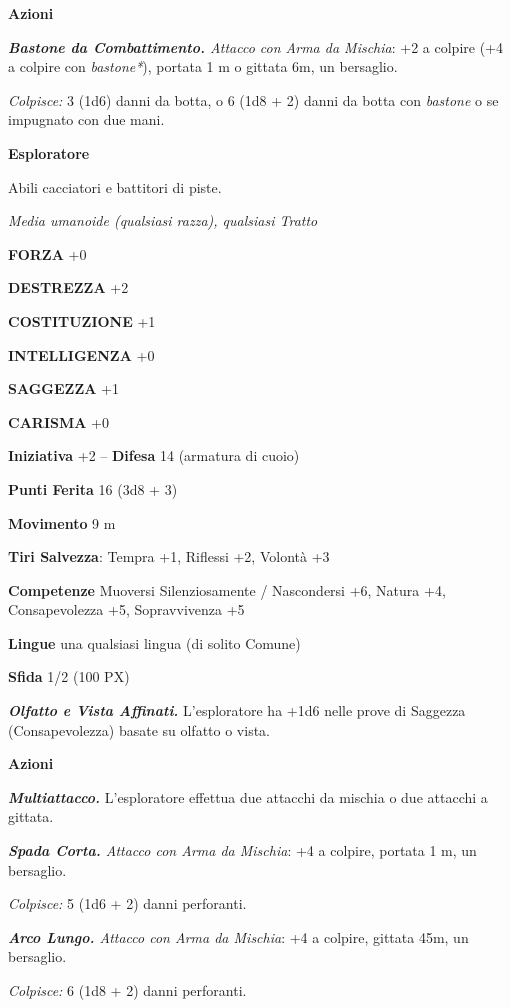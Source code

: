 \begin{multicols}{2}
	\textbf{Azioni}

	\textit{\textbf{Bastone da Combattimento.} Attacco con Arma da Mischia}: +2 a colpire (+4 a colpire con \textit{bastone*}), portata 1 m o gittata 6m, un bersaglio.

	\textit{Colpisce:} 3 (1d6) danni da botta, o 6 (1d8 + 2) danni da botta con \textit{bastone} o se impugnato con due mani.

	\medskip\textbf{Esploratore}

	Abili cacciatori e battitori di piste.

	\textit{Media umanoide (qualsiasi razza), qualsiasi Tratto}

	\textbf{FORZA} +0

	\textbf{DESTREZZA} +2

	\textbf{COSTITUZIONE} +1

	\textbf{INTELLIGENZA} +0

	\textbf{SAGGEZZA} +1

	\textbf{CARISMA} +0

	\textbf{Iniziativa} +2 -- \textbf{Difesa} 14 (armatura di cuoio)

	\textbf{Punti Ferita} 16 (3d8 + 3)

	\textbf{Movimento} 9 m

	\textbf{Tiri Salvezza}: Tempra +1, Riflessi +2, Volontà +3

	\textbf{Competenze} Muoversi Silenziosamente / Nascondersi +6, Natura +4, Consapevolezza +5, Sopravvivenza +5

	\textbf{Lingue} una qualsiasi lingua (di solito Comune)

	\textbf{Sfida} 1/2 (100 PX)

	\textit{\textbf{Olfatto e Vista Affinati.}} L'esploratore ha +1d6 nelle prove di Saggezza (Consapevolezza) basate su olfatto o vista.

	\textbf{Azioni}

	\textit{\textbf{Multiattacco.}} L'esploratore effettua due attacchi da mischia o due attacchi a gittata.

	\textit{\textbf{Spada Corta.} Attacco con Arma da Mischia}: +4 a colpire, portata 1 m, un bersaglio.

	\textit{Colpisce:} 5 (1d6 + 2) danni perforanti.

	\textit{\textbf{Arco Lungo.} Attacco con Arma da Mischia}: +4 a colpire, gittata 45m, un bersaglio.

	\textit{Colpisce:} 6 (1d8 + 2) danni perforanti.


\end{multicols}

